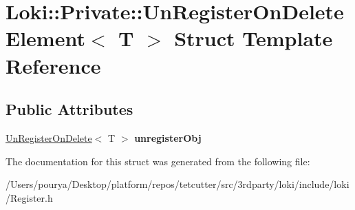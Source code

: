 \hypertarget{structLoki_1_1Private_1_1UnRegisterOnDeleteElement}{}\section{Loki\+:\+:Private\+:\+:Un\+Register\+On\+Delete\+Element$<$ T $>$ Struct Template Reference}
\label{structLoki_1_1Private_1_1UnRegisterOnDeleteElement}
\subsection*{Public Attributes}
\begin{DoxyCompactItemize}
\item 
\hypertarget{structLoki_1_1Private_1_1UnRegisterOnDeleteElement_a8c7dceb6db0496b98b493e32c5bd710e}{}\hyperlink{structLoki_1_1Private_1_1UnRegisterOnDelete}{Un\+Register\+On\+Delete}$<$ T $>$ {\bfseries unregister\+Obj}\label{structLoki_1_1Private_1_1UnRegisterOnDeleteElement_a8c7dceb6db0496b98b493e32c5bd710e}

\end{DoxyCompactItemize}


The documentation for this struct was generated from the following file\+:\begin{DoxyCompactItemize}
\item 
/\+Users/pourya/\+Desktop/platform/repos/tetcutter/src/3rdparty/loki/include/loki/Register.\+h\end{DoxyCompactItemize}
